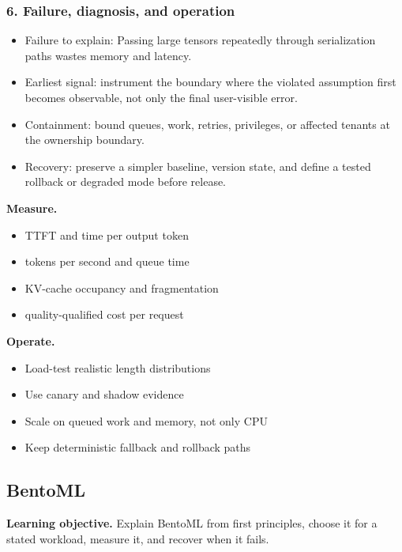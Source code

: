 \subsubsection*{6. Failure, diagnosis, and operation}
\begin{itemize}
\item Failure to explain: Passing large tensors repeatedly through serialization paths wastes memory and latency.
\item Earliest signal: instrument the boundary where the violated assumption first becomes observable, not only the final user-visible error.
\item Containment: bound queues, work, retries, privileges, or affected tenants at the ownership boundary.
\item Recovery: preserve a simpler baseline, version state, and define a tested rollback or degraded mode before release.
\end{itemize}
\textbf{Measure.}\begin{itemize}
\item TTFT and time per output token
\item tokens per second and queue time
\item KV-cache occupancy and fragmentation
\item quality-qualified cost per request
\end{itemize}
\textbf{Operate.}\begin{itemize}
\item Load-test realistic length distributions
\item Use canary and shadow evidence
\item Scale on queued work and memory, not only CPU
\item Keep deterministic fallback and rollback paths
\end{itemize}
\subsection{BentoML}
\textbf{Learning objective.} Explain BentoML from first principles, choose it for a stated workload, measure it, and recover when it fails.
